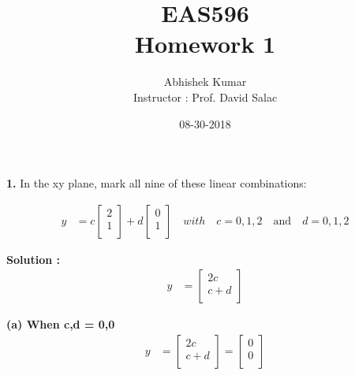 \documentclass{article}
\title{EAS596 \\ Homework 1}
\date{08-30-2018}
\author{Abhishek Kumar\\Instructor : Prof. David Salac}
\begin{document}
\maketitle

\textbf{1.} In the xy plane, mark all nine of these linear combinations:

\begin{align*}
    y &= c\begin{bmatrix}
           2 \\
           1 \\
         \end{bmatrix}+
         d\begin{bmatrix}
         0\\
         1\\
         \end{bmatrix} \quad with\quad c = 0,1,2 \quad \textrm{and} \quad d = 0,1,2
\end{align*}

\textbf{Solution :}\\
\begin{align*}
y &= \begin{bmatrix}
           2c \\
           c+d \\
         \end{bmatrix}
\end{align*}




\textbf{(a) When c,d = 0,0}
\begin{align*}
y &= \begin{bmatrix}
           2c \\
           c+d \\
         \end{bmatrix} = \begin{bmatrix}
           0 \\
           0 \\
         \end{bmatrix}
\end{align*}
\begin{center}
\end{center}
\end{document}
